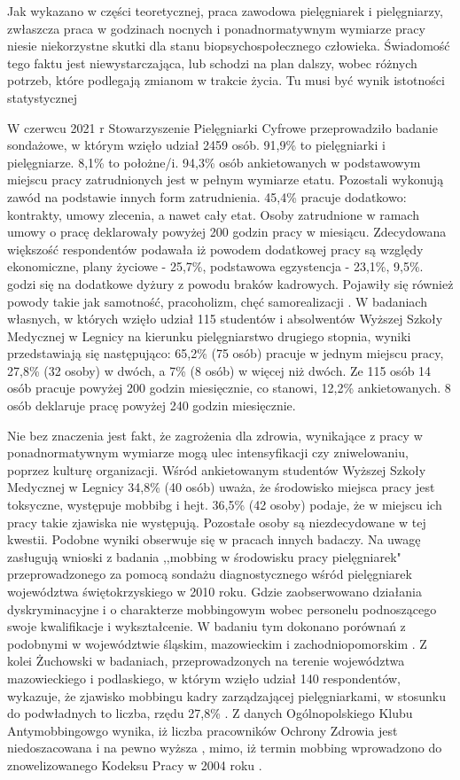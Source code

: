 \documentclass[a4paper,12pt,twoside,openright]{mwrep}
\begin{document}
Jak wykazano w części teoretycznej, praca zawodowa pielęgniarek i pielęgniarzy, zwłaszcza praca w godzinach nocnych i ponadnormatywnym wymiarze pracy niesie niekorzystne skutki dla stanu biopsychospołecznego człowieka. Świadomość tego faktu jest niewystarczająca, lub schodzi na plan dalszy, wobec różnych potrzeb, które podlegają zmianom w trakcie życia. Tu musi być wynik istotności statystycznej

W czerwcu 2021 r Stowarzyszenie Pielęgniarki Cyfrowe przeprowadziło badanie sondażowe, w którym wzięło udział 2459 osób. 91,9\% to pielęgniarki i pielęgniarze. 8,1\% to położne/i.  94,3\%   osób ankietowanych w podstawowym miejscu pracy zatrudnionych jest w pełnym wymiarze etatu. Pozostali wykonują zawód na podstawie innych form zatrudnienia. 45,4\%  pracuje dodatkowo: kontrakty, umowy zlecenia, a nawet cały etat. Osoby zatrudnione w ramach umowy o pracę deklarowały powyżej 200 godzin pracy w miesiącu. Zdecydowana większość respondentów podawała iż powodem dodatkowej pracy są względy ekonomiczne, plany życiowe - 25,7\%,  podstawowa egzystencja -  23,1\%, 9,5\%. godzi się na dodatkowe dyżury z powodu braków kadrowych. Pojawiły się również powody takie jak samotność, pracoholizm, chęć samorealizacji \cite{cyfrowe}. W badaniach własnych, w których wzięło udział 115 studentów i absolwentów Wyższej Szkoły Medycznej  w Legnicy na kierunku pielęgniarstwo drugiego stopnia, wyniki  przedstawiają się następująco: 65,2\% (75 osób) pracuje w jednym miejscu pracy, 27,8\%  (32 osoby) w dwóch, a 7\%  (8 osób) w więcej niż dwóch.  Ze 115 osób 14 osób pracuje powyżej 200 godzin miesięcznie, co stanowi, 12,2\% ankietowanych. 8 osób deklaruje pracę powyżej  240 godzin miesięcznie.


Nie bez znaczenia jest fakt, że zagrożenia  dla zdrowia, wynikające z pracy w ponadnormatywnym wymiarze mogą ulec intensyfikacji czy zniwelowaniu, poprzez kulturę organizacji. Wśród ankietowanym studentów Wyższej Szkoły Medycznej w Legnicy 34,8\% (40 osób) uważa, że środowisko miejsca pracy jest toksyczne, występuje mobbibg i hejt. 36,5\% (42 osoby) podaje, że w miejscu ich pracy takie zjawiska nie występują. Pozostałe osoby są niezdecydowane w tej kwestii.  Podobne wyniki obserwuje się w pracach innych badaczy. Na uwagę zasługują wnioski z badania ,,mobbing w środowisku pracy pielęgniarek" przeprowadzonego za pomocą sondażu diagnostycznego wśród pielęgniarek województwa świętokrzyskiego w 2010 roku. Gdzie zaobserwowano działania dyskryminacyjne i o charakterze mobbingowym wobec personelu podnoszącego swoje kwalifikacje i wykształcenie. W badaniu tym dokonano porównań z podobnymi w województwie śląskim, mazowieckim i zachodniopomorskim \cite{mobbing}. Z kolei Żuchowski w badaniach, przeprowadzonych na terenie województwa mazowieckiego i podlaskiego, w którym wzięło udział 140 respondentów, wykazuje, że zjawisko mobbingu kadry zarządzającej pielęgniarkami, w stosunku do podwładnych to liczba, rzędu 27,8\% \cite{zuchowski}. Z danych Ogólnopolskiego Klubu Antymobbingowgo wynika, iż liczba pracowników Ochrony Zdrowia jest niedoszacowana i na pewno wyższa \cite{grabowski}, mimo, iż termin mobbing wprowadzono do znowelizowanego Kodeksu Pracy w 2004 roku \cite{kodeks}.
\end{document}
